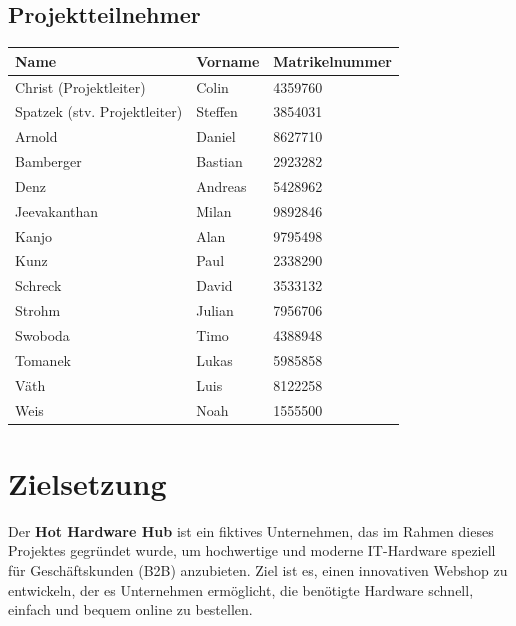 \documentclass[%
	ngerman,
	12pt,
	a4paper,
	oneside,
	parskip=full
]{scrbook}
\begin{document}
\section{Projektteilnehmer}
\begin{tabular}{l|l|l}
	\textbf{Name}                & \textbf{Vorname} & \textbf{Matrikelnummer} \\ \hline
	Christ (Projektleiter)       & Colin            & 4359760                 \\
	Spatzek (stv. Projektleiter) & Steffen          & 3854031                 \\ \hline
	Arnold                       & Daniel           & 8627710                 \\
	Bamberger                    & Bastian          & 2923282                 \\
	Denz                         & Andreas          & 5428962                 \\
	Jeevakanthan                 & Milan            & 9892846                 \\
	Kanjo                        & Alan             & 9795498                 \\
	Kunz                         & Paul             & 2338290                 \\
	Schreck                      & David            & 3533132                 \\
	Strohm                       & Julian           & 7956706                 \\
	Swoboda                      & Timo             & 4388948                 \\
	Tomanek                      & Lukas            & 5985858                 \\
	Väth                         & Luis             & 8122258                 \\
	Weis                         & Noah             & 1555500
\end{tabular}

\tableofcontents

\chapter{Zielsetzung}
Der \textbf{Hot Hardware Hub} ist ein fiktives Unternehmen, das im Rahmen dieses Projektes gegründet wurde, um hochwertige und moderne IT-Hardware speziell für Geschäftskunden (B2B) anzubieten.
Ziel ist es, einen innovativen Webshop zu entwickeln, der es Unternehmen ermöglicht, die benötigte Hardware schnell, einfach und bequem online zu bestellen.
\end{document}

